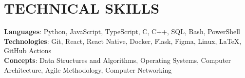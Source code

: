 \section{\textbf {\large TECHNICAL SKILLS}}
    \begin{itemize}[leftmargin=0.15in, label={}]
	\small{\item{
		\textbf{Languages}{: Python, JavaScript, TypeScript, C, C++, SQL, Bash, PowerShell} \\
		\textbf{Technologies}{: Git, React, React Native, Docker, Flask, Figma, Linux, LaTeX, GitHub Actions} \\
		\textbf{Concepts}{: Data Structures and Algorithms, Operating Systems, Computer Architecture, Agile Methodology, Computer Networking}
	}}
    \end{itemize}